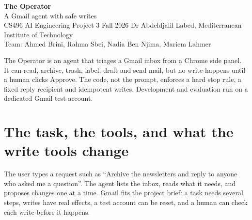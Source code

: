\documentclass[10pt,a4paper]{article}
\begin{document}
\begin{center}
  {\sffamily\bfseries\fontsize{26}{28}\selectfont\color{accent} The Operator}\\[3pt]
  {\sffamily\large A Gmail agent with safe writes}\\[5pt]
  {\sffamily\small CS496 AI Engineering \textbullet{} Project 3 \textbullet{} Fall 2026 \textbullet{} Dr Abdeldjalil Labed, Mediterranean Institute of Technology}\\[2pt]
  {\sffamily\small Team: Ahmed Brini, Rahma Sbei, Nadia Ben Njima, Mariem Lahmer}
\end{center}
\vspace{-4pt}

\begin{tcolorbox}[info]
The Operator is an agent that triages a Gmail inbox from a Chrome side panel. It can read, archive, trash, label,
draft and send mail, but no write happens until a human clicks Approve. The code, not the prompt, enforces a hard stop
rule, a fixed reply recipient and idempotent writes. Development and evaluation run on a dedicated Gmail test account.
\end{tcolorbox}

\section{The task, the tools, and what the write tools change}

The user types a request such as ``Archive the newsletters and reply to anyone who asked me a question''. The agent lists the
inbox, reads what it needs, and proposes changes one at a time. Gmail fits the project brief: a task needs several steps, writes
have real effects, a test account can be reset, and a human can check each write before it happens.
\end{document}
